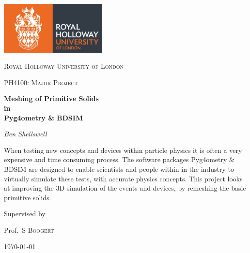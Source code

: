 \documentclass[12pt,a4paper]{article}
\begin{document}
\begin{titlepage}
	\centering
	\includegraphics[width=0.4\textwidth]{Images//Logos//rhul.jpg}\par\vspace{1cm}


	{\scshape\LARGE Royal Holloway University of London \par}
	\vspace{1cm}
	{\scshape\Large PH4100: Major Project\par}
	\vspace{1.5cm}
	{\huge\bfseries Meshing of Primitive Solids\\
	in\\
	Pyg4ometry \& BDSIM\par}
	\vspace{2cm}
	{\Large\itshape Ben Shellswell\par}
	\vfill

\begin{abstract}
\centering

\end{abstract}
When testing new concepts and devices within particle physics it is often a very expensive and time consuming process. The software packages Pyg4ometry \& BDSIM are designed to enable scientists and people within in the industry to virtually simulate these tests, with accurate physics concepts. This project looks at improving the 3D simulation of the events and devices, by remeshing the basic primitive solids.

	\vfill
	
	Supervised by\par
	Prof.~S \textsc{Boogert} 

	{\large \today\par}




\end{titlepage}
\end{document}
